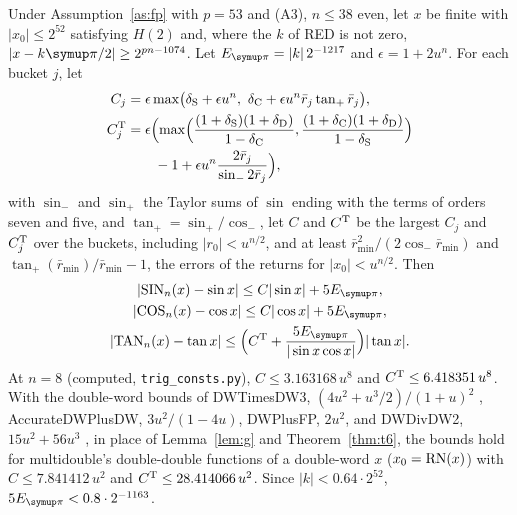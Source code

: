 \begin{theorem}\label{thm:trig}
Under Assumption~\ref{as:fp} with $p = 53$ and (A3), $n \le 38$ even, let $x$ be finite with $|x_0| \le 2^{52}$
satisfying $H(2)$ and, where the $k$ of RED is not zero, $|x - k\cpi/2| \ge 2^{pn-1074}$. Let
$E_{\cpi} = |k|\,2^{-1217}$ and $\epsilon = 1 + 2u^n$. For each bucket $j$, let
\begin{align*}
C_j &= \epsilon\max\bigl(\delta_{\rm S} + \epsilon u^n,\ \delta_{\rm C} + \epsilon u^n\bar r_j\tan_+ \bar r_j\bigr), \\
C^{\rm T}_j &= \epsilon\Bigl(\max\Bigl(\frac{(1+\delta_{\rm S})(1+\delta_{\rm D})}{1 - \delta_{\rm C}},
  \frac{(1+\delta_{\rm C})(1+\delta_{\rm D})}{1 - \delta_{\rm S}}\Bigr) \\
&\qquad - 1 + \epsilon u^n\frac{2\bar r_j}{\sin_-2\bar r_j}\Bigr),
\end{align*}
with $\sin_-$ and $\sin_+$ the Taylor sums of $\sin$ ending with the terms of orders seven and five, and $\tan_+ =
\sin_+/\cos_-$, let $C$ and $C^{\rm T}$ be the largest $C_j$ and $C^{\rm T}_j$ over the buckets, including $|r_0| < u^{n/2}$, and at least
$\bar r_{\min}^2/(2\cos_-\bar r_{\min})$ and $\tan_+(\bar r_{\min})/\bar r_{\min} - 1$, the errors of the returns for $|x_0| <
u^{n/2}$. Then
\begin{gather*}
|\mathrm{SIN}_n(x) - \sin x| \le C|\sin x| + 5E_{\cpi}, \\
|\mathrm{COS}_n(x) - \cos x| \le C|\cos x| + 5E_{\cpi}, \\
|\mathrm{TAN}_n(x) - \tan x| \le \Bigl(C^{\rm T} + \frac{5E_{\cpi}}{|\sin x\cos x|}\Bigr)|\tan x|.
\end{gather*}
At $n = 8$ (computed, \texttt{trig\_consts.py}), $C \le 3.163168\,u^8$ and $C^{\rm T} \le 6.418351\,u^8$. With the double-word bounds of DWTimesDW3,
$(4u^2 + u^3/2)/(1+u)^2$ \cite{MR22}, AccurateDWPlusDW, $3u^2/(1-4u)$, DWPlusFP, $2u^2$, and DWDivDW2, $15u^2 +
56u^3$ \cite{JMP17}, in place of Lemma~\ref{lem:g} and Theorem~\ref{thm:t6}, the bounds hold for multidouble's
double-double functions of a double-word $x$ ($x_0 = \mathrm{RN}(x)$) with $C \le 7.841412\,u^2$ and $C^{\rm T} \le
28.414066\,u^2$. Since $|k| < 0.64\cdot2^{52}$, $5E_{\cpi} < 0.8\cdot2^{-1163}$.
\end{theorem}

